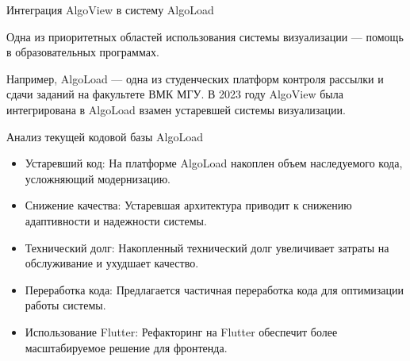 \begin{frame}{Интеграция AlgoView в систему AlgoLoad}

Одна из приоритетных областей использования системы визуализации — помощь в образовательных программах. 

\vspace{5mm}

Например, AlgoLoad — одна из студенческих платформ контроля рассылки и сдачи заданий на факультете ВМК МГУ. В 2023 году AlgoView была интегрирована в AlgoLoad взамен устаревшей системы визуализации.



\end{frame}




\begin{frame}{Анализ текущей кодовой базы AlgoLoad}
\begin{itemize}
    \item Устаревший код: На платформе AlgoLoad накоплен объем наследуемого кода, усложняющий модернизацию.
    
    \item Снижение качества: Устаревшая архитектура приводит к снижению адаптивности и надежности системы.
    
    \item Технический долг: Накопленный технический долг увеличивает затраты на обслуживание и ухудшает качество.
    
    \item Переработка кода: Предлагается частичная переработка кода для оптимизации работы системы.
    
    \item Использование Flutter: Рефакторинг на Flutter обеспечит более масштабируемое решение для фронтенда.
    
\end{itemize}
\end{frame}



